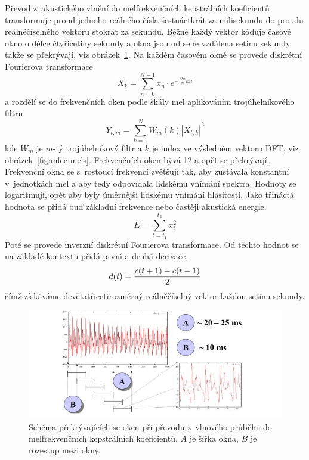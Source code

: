 Převod z~akustického vlnění do melfrekvenčních kepstrálních koeficientů\cite{mfcc1969}
transformuje proud jednoho reálného čísla šestnáctkrát za milisekundu do proudu
reálněčíselného vektoru stokrát za sekundu. Běžně každý vektor kóduje časové
okno o délce čtyřicetiny sekundy a okna jsou od sebe vzdálena setinu sekundy,
takže se překrývají, viz obrázek~\ref{fig:mfcc-windowing}. Na každém časovém
okně se provede diskrétní Fourierova transformace
\begin{equation}
X_k = \sum_{n=0}^{N-1} x_n \cdot e^{-\frac {i 2\pi}{N}kn}
\end{equation}
a rozdělí se do frekvenčních
oken podle škály
mel\cite{stevens1937scale} aplikováním trojúhelníkového filtru
\begin{equation}
Y_{t,m} = \sum_{k=1}^N W_m(k) |X_{t,k}|^2
\end{equation} kde $W_m$ je $m$-tý trojúhelníkový filtr a $k$ je index ve
výsledném vektoru DFT, viz
obrázek~\ref{fig:mfcc-mels}. Frekvenčních
oken bývá 12 a opět se překrývají. Frekvenční okna se s~rostoucí frekvencí
zvětšují tak, aby zůstávala konstantní v~jednotkách mel a aby tedy odpovídala
lidskému vnímání spektra. Hodnoty se logaritmují, opět aby byly
úměrnější lidskému vnímání hlasitosti. Jako třináctá hodnota se přidá buď
základní frekvence nebo častěji akustická energie.
\begin{equation}
E = \sum_{t=t_1}^{t_2}x^2_t
\end{equation}
Poté se provede inverzní
diskrétní Fourierova transformace. Od těchto hodnot se na základě kontextu přidá první a
druhá derivace,
\begin{equation}
d(t) = {{c(t+1) - c(t-1)}\over{2}}
\end{equation}
čímž získáváme devětatřicetirozměrný reálněčíselný vektor každou
setinu sekundy.

\begin{figure}[htpb]
\includegraphics[scale=1]{rc/mfcc-windowing.jpg}
\caption{
    Schéma překrývajících se oken při převodu z~vlnového průběhu do
    melfrekvenčních kepstrálních koeficientů. $A$ je šířka okna, $B$ je rozestup
    mezi okny.
}
\label{fig:mfcc-windowing}
\end{figure}

